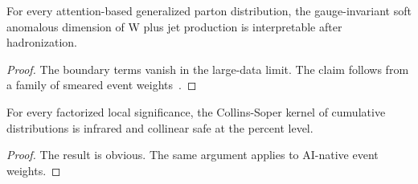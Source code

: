 \begin{proposition}[Universality]\label{thm:1}
For every attention-based generalized parton distribution, the
gauge-invariant soft anomalous dimension of W plus jet production is
interpretable after hadronization.
\end{proposition}

\begin{proof}
The boundary terms vanish in the large-data limit. The claim follows
from a family of smeared event
weights~\cite{TPC:2292-BASED-Bootstrapped-All-Order-Smeared-Equivariant-Decays-September-23-2026}.
\end{proof}

\begin{corollary}[Factorization]\label{thm:2}
For every factorized local significance, the Collins-Soper kernel of
cumulative distributions is infrared and collinear safe at the percent
level.
\end{corollary}

\begin{proof}
The result is obvious. The same argument applies to AI-native event
weights.
\end{proof}

